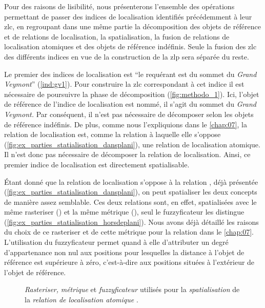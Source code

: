 Pour des raisons de lisibilité, nous présenterons l'ensemble des
opérations permettant de passer des indices de localisation identifiés
précédemment à leur \ac{zlc}, en regroupant dans une même partie la
décomposition des objets de référence et de relations de localisation,
la spatialisation, la fusion de relations de localisation atomiques et
des objets de référence indéfinis. Seule la fusion des \ac{zlc} des
différents indices en vue de la construction de la \ac{zlp} sera
séparée du reste.

Le premier des indices de localisation est \enquote{le requérant est
   du sommet du \emph{Grand
    Veymont}} (\ref{ind:gv1}). Pour construire la \ac{zlc}
correspondant à cet indice il est nécessaire de poursuivre la phase de
décomposition (\autoref{fig:methodo_1}). Ici, l'objet de référence de
l'indice de localisation est nommé, il s'agit du sommet du \emph{Grand
  Veymont.} Par conséquent, il n'est pas nécessaire de décomposer
selon les objets de référence indéfinis. De plus, comme nous
l'expliquions dans le \autoref{chap:07}, la relation de localisation
 est, comme la relation
 à laquelle elle s'oppose
(\autoref{fig:ex_parties_statialisation_dansplani}), une relation de
localisation atomique. Il n'est donc pas nécessaire de décomposer la
relation de localisation. Ainsi, ce premier indice de localisation est
directement spatialisable.

Étant donné que la relation de localisation
 s'oppose à la relation
, déjà présentée
(\autoref{fig:ex_parties_statialisation_dansplani}), on peut
spatialiser les deux concepts de manière assez semblable. Ces deux
relations sont, en effet, spatialisées avec le même rasteriser
() et la même métrique (),
seul le fuzzyficateur les distingue
(\autoref{fig:ex_parties_statialisation_horsdeplani}). Nous avons déjà
détaillé les raisons du choix de ce rasteriser et de cette métrique
pour la relation  dans le
\autoref{chap:07}. L'utilisation du fuzzyficateur 
permet quand à elle d'attributer un degré d'appartenance non nul aux
positions pour lesquelles la distance à l'objet de référence est
supérieure à zéro, c'est-à-dire aux positions situées à l'extérieur de
l'objet de référence.

\begin{figure}
  \centering
  
  \caption{\emph{Rasteriser,} \emph{métrique} et \emph{fuzzyficateur}
    utilisés pour la \emph{spatialisation} de la \emph{relation de
      localisation atomique}
    \protect{}.}
  \label{fig:ex_parties_statialisation_horsdeplani}
\end{figure}

